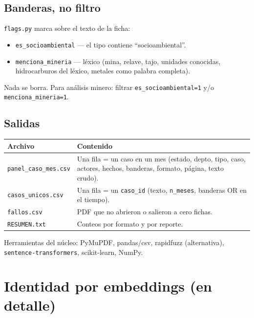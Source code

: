 \documentclass[11pt,a4paper]{article}
\begin{document}
\subsection{Banderas, no filtro}

\texttt{flags.py} marca sobre el texto de la ficha:

\begin{itemize}
  \item \texttt{es\_socioambiental} --- el tipo contiene ``socioambiental''.
  \item \texttt{menciona\_mineria} --- léxico (mina, relave, tajo, unidades conocidas, hidrocarburos del léxico, metales como palabra completa).
\end{itemize}

Nada se borra. Para análisis minero: filtrar \texttt{es\_socioambiental=1} y/o \texttt{menciona\_mineria=1}.

\subsection{Salidas}

\begin{center}
\renewcommand{\arraystretch}{1.15}
\begin{tabularx}{\textwidth}{@{}l Y@{}}
\toprule
\textbf{Archivo} & \textbf{Contenido} \\
\midrule
\texttt{panel\_caso\_mes.csv} & Una fila = un caso en un mes (estado, depto, tipo, caso, actores, hechos, banderas, formato, página, texto crudo). \\
\texttt{casos\_unicos.csv} & Una fila = un \texttt{caso\_id} (texto, \texttt{n\_meses}, banderas OR en el tiempo). \\
\texttt{fallos.csv} & PDF que no abrieron o salieron a cero fichas. \\
\texttt{RESUMEN.txt} & Conteos por formato y por reporte. \\
\bottomrule
\end{tabularx}
\end{center}

Herramientas del núcleo: PyMuPDF, pandas/csv, rapidfuzz (alternativa), \texttt{sentence-transformers}, scikit-learn, NumPy.

\section{Identidad por embeddings (en detalle)}
\end{document}
